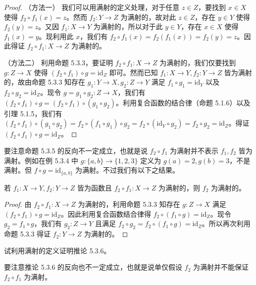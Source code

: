 \begin{proof}
（方法一） 我们可以用满射的定义处理，对于任意 $z \in Z$，要找到 $x \in X$ 使得 $f_2 \circ f_1(x) = z$。然而 $f_2 : Y \to Z$ 为满射的，故对此 $z \in Z$，存在 $y \in Y$ 使得 $f_2(y) = z$。又因 $f_1 : X \to Y$ 为满射的，所以对于此 $y \in Y$，存在 $x \in X$ 使得 $f_1(x) = y$。现利用此 $x$，我们有 $f_2 \circ f_1(x) = f_2(f_1(x)) = f_2(y) = z$。因此得证 $f_2 \circ f_1 : X \to Z$ 为满射的。

（方法二） 利用命题 5.3.3，要证明 $f_2 \circ f_1 : X \to Z$ 为满射的，我们仅要找到 $g : Z \to X$ 使得 $(f_2 \circ f_1) \circ g = \mathrm{id}_Z$ 即可。然而已知 $f_1 : X \to Y, f_2 : Y \to Z$ 皆为满射的，故由命题 5.3.3 知存在 $g_1 : Y \to X, g_2 : Z \to Y$ 满足 $f_1 \circ g_1 = \mathrm{id}_Y$ 以及 $f_2 \circ g_2 = \mathrm{id}_Z$。现令 $g = g_1 \circ g_2 : Z \to X$，我们有 $(f_2 \circ f_1) \circ g = (f_2 \circ f_1) \circ (g_1 \circ g_2)$。利用复合函数的结合律（命题 5.1.6）以及引理 5.1.5，我们有 $(f_2 \circ f_1) \circ (g_1 \circ g_2) = f_2 \circ (f_1 \circ g_1) \circ g_2 = f_2 \circ (\mathrm{id}_Y \circ g_2) = f_2 \circ g_2 = \mathrm{id}_Z$。得证 $(f_2 \circ f_1) \circ g = \mathrm{id}_Z$。
\end{proof}

要注意命题 5.3.5 的反向不一定成立，也就是说 $f_2 \circ f_1$ 为满射并不表示 $f_1, f_2$ 皆为满射。例如在例 5.3.4 中 $g : \{a, b\} \to \{1, 2, 3\}$ 定义为 $g(a) = 2, g(b) = 3$，不是满射。但 $f \circ g = \mathrm{id}_{\{a,b\}}$ 为满射。不过我们有以下之结果。

\begin{corollary}
若 $f_1 : X \to Y, f_2 : Y \to Z$ 皆为函数且 $f_2 \circ f_1 : X \to Z$ 为满射的，则 $f_2$ 为满射的。
\end{corollary}

\begin{proof}
由 $f_2 \circ f_1 : X \to Z$ 为满射的，利用命题 5.3.3 知存在 $g : Z \to X$ 满足 $(f_2 \circ f_1) \circ g = \mathrm{id}_Z$。因此利用复合函数结合律得 $f_2 \circ (f_1 \circ g) = \mathrm{id}_Z$。现令 $g_2 = f_1 \circ g$，我们有 $g_2 : Z \to Y$ 且满足 $f_2 \circ g_2 = f_2 \circ (f_1 \circ g) = \mathrm{id}_Z$。所以再次利用命题 5.3.3 得证 $f_2 : Y \to Z$ 为满射的。
\end{proof}

\begin{question}
试利用满射的定义证明推论 5.3.6。
\end{question}

要注意推论 5.3.6 的反向也不一定成立，也就是说单仅假设 $f_2$ 为满射并不能保证 $f_2 \circ f_1$ 为满射。


